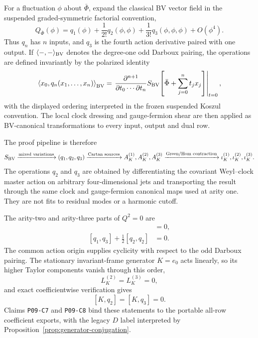 \documentclass[11pt]{article}
\theoremstyle{definition}
\theoremstyle{remark}
\newcommand{\claimid}[1]{\texttt{#1}}
\begin{document}
For a fluctuation $\phi$ about $\bar\Phi$, expand the classical BV vector
field in the suspended graded-symmetric factorial convention,
\begin{equation}\label{eq:Qexpansion}
 Q_{\bar\Phi}(\phi)
 =q_1(\phi)+\frac1{2!}q_2(\phi,\phi)
 +\frac1{3!}q_3(\phi,\phi,\phi)+O(\phi^4).
\end{equation}
Thus $q_n$ has $n$ inputs, and $q_3$ is the fourth action derivative paired
with one output.  If $\langle-,-\rangle_{\rm BV}$ denotes the degree-one odd
Darboux pairing, the operations are defined invariantly by the polarized
identity
\begin{equation}\label{eq:variational-qn}
 \left\langle x_0,q_n(x_1,\ldots,x_n)\right\rangle_{\rm BV}
 =\left.
 \frac{\partial^{n+1}}
 {\partial t_0\cdots\partial t_n}
 S_{\rm BV}\!\left[\bar\Phi+\sum_{j=0}^nt_jx_j\right]
 \right|_{t=0},
\end{equation}
with the displayed ordering interpreted in the frozen suspended Koszul
convention.  The local clock dressing and gauge-fermion shear are then applied
as BV-canonical transformations to every input, output and dual row.

The proof pipeline is therefore
\begin{equation}\label{eq:proof-pipeline}
 S_{\rm BV}\xrightarrow{\text{mixed variations}}(q_1,q_2,q_3)
 \xrightarrow{\text{Cartan sources}} A_K^{(1)},A_K^{(2)},A_K^{(3)}
 \xrightarrow{\text{Green/Hom contraction}}\iota_K^{(1)},
 \iota_K^{(2)},\iota_K^{(3)}.
\end{equation}
The operations $q_2$ and $q_3$ are obtained by differentiating the covariant
Weyl--clock master action on arbitrary four-dimensional jets and transporting
the result through the same clock and gauge-fermion canonical maps used at
arity one.  They are not fits to residual modes or a harmonic cutoff.

The arity-two and arity-three parts of $Q^2=0$ are
\begin{align}
 [q_1,q_2]&=0,\label{eq:Linf2}\\
 [q_1,q_3]+\frac12[q_2,q_2]&=0.\label{eq:Linf3}
\end{align}
The common action origin supplies cyclicity with respect to the odd Darboux
pairing.  The stationary invariant-frame generator $K=e_0$ acts linearly,
so its higher Taylor components vanish through this order,
\begin{equation}\label{eq:LDhigher}
 L_K^{(2)}=L_K^{(3)}=0,
\end{equation}
and exact coefficientwise verification gives
\begin{equation}\label{eq:Dderivation}
 [K,q_2]=[K,q_3]=0.
\end{equation}
Claims \claimid{P09-C7} and \claimid{P09-C8} bind these statements to the
portable all-row coefficient exports, with the legacy $D$ label interpreted
by Proposition~\ref{prop:generator-conjugation}.
\end{document}

